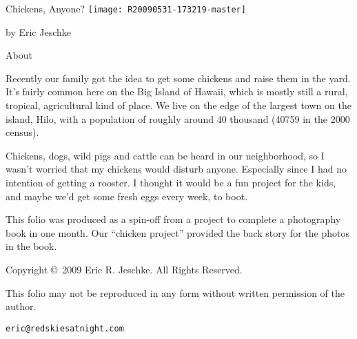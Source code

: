 %
%
% 


{\huge Chickens, Anyone?}
\texttt{[image: R20090531-173219-master]}

\begin{flushright}
{\Large by Eric Jeschke}
\end{flushright}
\newpage


\vspace*{1in}
{\LARGE About}
\vspace*{0.25in}

Recently our family got the idea to get some chickens and raise them in
the yard. It's fairly common here on the Big Island of 
Hawaii, which is mostly still a rural, tropical, agricultural kind of
place. We live on the edge of the largest town on the island, Hilo, with
a population of roughly around 40 thousand (40759 in the 2000 census).

Chickens, dogs, wild pigs and cattle can be heard in our neighborhood,
so I wasn't worried that my chickens would disturb anyone. Especially
since I had no intention of getting a rooster. I thought it would be a
fun project for the kids, and maybe we'd get some fresh eggs every week,
to boot. 

This folio was produced as a spin-off from a project to complete a
photography book in one month.  Our ``chicken project'' provided the
back story for the photos in the book.

\vspace*{1.0in}

{\large Copyright \copyright \  2009 Eric R. Jeschke.  All Rights Reserved.}

This folio may not be reproduced in any form without written permission
of the author. 

{\tt eric@redskiesatnight.com}

\newpage

